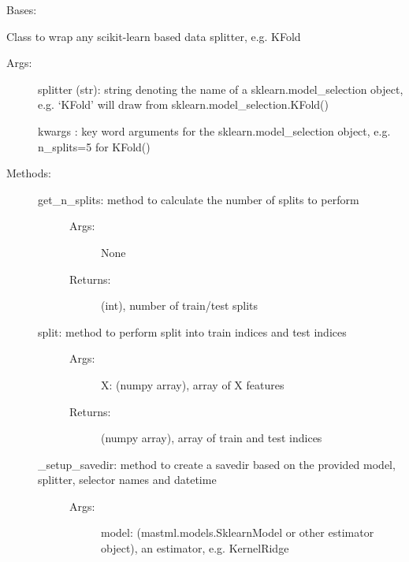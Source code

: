 \documentclass[letterpaper,10pt,english]{sphinxmanual}
\begin{document}
\begin{fulllineitems}
\label{\detokenize{api/mastml.data_splitters.SklearnDataSplitter:mastml.data_splitters.SklearnDataSplitter}}
Bases: {\hyperref[\detokenize{api/mastml.data_splitters.BaseSplitter:mastml.data_splitters.BaseSplitter}]{}}

Class to wrap any scikit-learn based data splitter, e.g. KFold
\begin{description}
\item[{Args:}] \leavevmode
splitter (str): string denoting the name of a sklearn.model\_selection object, e.g. ‘KFold’ will draw from sklearn.model\_selection.KFold()

kwargs : key word arguments for the sklearn.model\_selection object, e.g. n\_splits=5 for KFold()

\item[{Methods:}] \leavevmode\begin{description}
\item[{get\_n\_splits: method to calculate the number of splits to perform}] \leavevmode\begin{description}
\item[{Args:}] \leavevmode
None

\item[{Returns:}] \leavevmode
(int), number of train/test splits

\end{description}

\item[{split: method to perform split into train indices and test indices}] \leavevmode\begin{description}
\item[{Args:}] \leavevmode
X: (numpy array), array of X features

\item[{Returns:}] \leavevmode
(numpy array), array of train and test indices

\end{description}

\item[{\_setup\_savedir: method to create a savedir based on the provided model, splitter, selector names and datetime}] \leavevmode\begin{description}
\item[{Args:}] \leavevmode
model: (mastml.models.SklearnModel or other estimator object), an estimator, e.g. KernelRidge


\end{description}
\end{description}
\end{description}
\end{fulllineitems}
\end{document}
